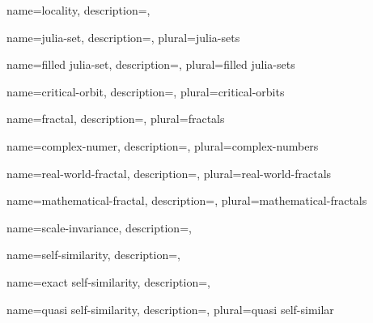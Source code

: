 {
    name={locality},
    description={},
}

{
    name={julia-set},
    description={},
    plural={julia-sets}
}

{
    name={filled julia-set},
    description={},
    plural={filled julia-sets}
}

{
    name={critical-orbit},
    description={},
    plural={critical-orbits}
}

{
    name={fractal},
    description={},
    plural={fractals}
}

{
    name={complex-numer},
    description={},
    plural={complex-numbers}
}

{
    name={real-world-fractal},
    description={},
    plural={real-world-fractals}
}

{
    name={mathematical-fractal},
    description={},
    plural={mathematical-fractals}
}

{
    name={scale-invariance},
    description={},
}

{
    name={self-similarity},
    description={},
}

{
    name={exact self-similarity},
    description={},
}

{
    name={quasi self-similarity},
    description={},
    plural={quasi self-similar}
}
